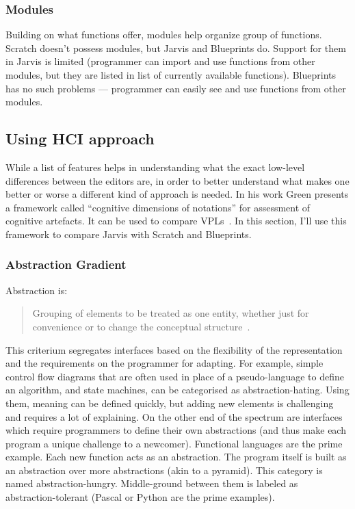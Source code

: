 \documentclass[11pt]{scrartcl}
\begin{document}
\subsubsection*{Modules}
Building on what functions offer, modules help organize group of functions.
Scratch doesn't possess modules, but Jarvis and Blueprints do. Support for them
in Jarvis is limited (programmer can import and use functions from other
modules, but they are listed in list of currently available functions).
Blueprints has no such problems --- programmer can easily see and use functions
from other modules.

\subsection{Using HCI approach}
While a list of features helps in understanding what the exact low-level
differences between the editors are, in order to better understand what makes one
better or worse a different kind of approach is needed.
In his work Green presents a framework called “cognitive dimensions
of notations” for assessment of cognitive artefacts.
It can be used to compare VPLs~\cite{Green96UsabilityAnalysis}. In this section,
I’ll use this framework to compare Jarvis with Scratch and Blueprints.

\subsubsection{Abstraction Gradient}
Abstraction is:
\blockquote{Grouping of elements to be
  treated as one entity, whether just for convenience or to change the
  conceptual structure~\cite{Green96UsabilityAnalysis}.}
This criterium segregates interfaces based on the flexibility of the
representation and the requirements on the programmer for adapting.
For example, simple control flow diagrams that are often used in place of a
pseudo-language to define an algorithm, and state machines, can be categorised
as abstraction-hating.
Using them, meaning can be defined quickly, but adding new elements is
challenging and requires a lot of explaining.
On the other end of the spectrum are interfaces which require programmers to
define their own abstractions (and thus make each program a unique challenge to
a newcomer).
Functional languages are the prime example.
Each new function acts as an abstraction.
The program itself is built as an abstraction over more abstractions (akin to a
pyramid).
This category is named abstraction-hungry.
Middle-ground between them is labeled as abstraction-tolerant (Pascal or Python
are the prime examples).
\end{document}
